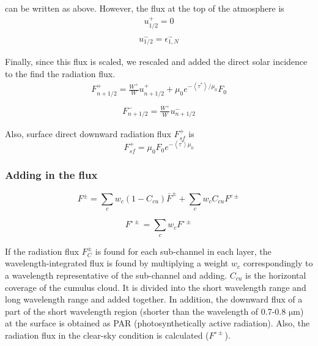 can be written as above. However, the flux at the top of the atmosphere
is \begin{equation}
\begin{array}{c}
u_{1 / 2}^{+}=0 \\
\end{array}
\end{equation} \begin{equation}
\begin{array}{c}
u_{1 / 2}^{-}=\epsilon_{1, N}^{-}
\end{array}
\end{equation}

Finally, since this flux is scaled, we rescaled and added the direct
solar incidence to the find the radiation flux. \begin{equation}
\begin{array}{c}
F_{n+1 / 2}^{+}=\frac{W^{+}}{W} u_{n+1 / 2}^{+}+\mu_{0} e^{-\left\langle\tau^{*}\right\rangle / \mu_{0}} F_{0} \\
\end{array}
\end{equation} \begin{equation}
\begin{array}{c}
F_{n+1 / 2}^{-}=\frac{W^{+}}{W} u_{n+1 / 2}^{-}
\end{array}
\end{equation}

Also, surface direct downward radiation flux \(F_{s f}^{+}\) is \begin{equation}
F_{s f}^{+}=\mu_{0} F_{0} e^{-\left\langle\tau^{*}\rangle\ \mu_{0}\right.}
\end{equation}

\hypertarget{adding-in-the-flux}{%
\subsubsection{Adding in the flux}\label{adding-in-the-flux}}

\begin{equation}
F^{\pm}=\sum_{c} w_{c}\left(1-C_{c u}\right) \bar{F}^{\pm}+\sum_{c} w_{c} C_{c u} F^{c \pm}
\end{equation}

\begin{equation}
F^{\circ \pm}=\sum_{c} w_{c} F^{\circ \pm}
\end{equation}

If the radiation flux \(F_{C}^{\pm}\) is found for each sub-channel in
each layer, the wavelength-integrated flux is found by multiplying a
weight \(w_c\) correspondingly to a wavelength representative of the
sub-channel and adding. \(C_{cu}\) is the horizontal coverage of the
cumulus cloud. It is divided into the short wavelength range and long
wavelength range and added together. In addition, the downward flux of a
part of the short wavelength region (shorter than the wavelength of
0.7-0.8 \(\mathrm{{\mu}m}\)) at the surface is obtained as PAR
(photosynthetically active radiation). Also, the radiation flux in the
clear-sky condition is calculated (\(F^{\circ \pm}\)).

